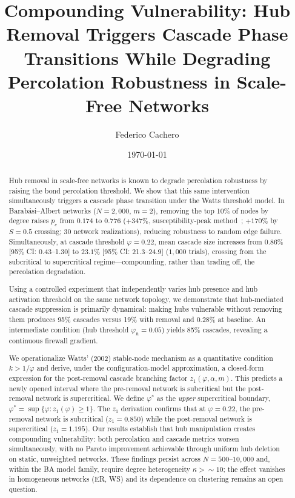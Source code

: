 \documentclass[aps,pre,twocolumn,superscriptaddress,showpacs]{revtex4-2}
\newcommand{\pc}{p_c}
\begin{document}
\title{Compounding Vulnerability: Hub Removal Triggers Cascade Phase Transitions While Degrading Percolation Robustness in Scale-Free Networks}

\author{Federico Cachero}

\date{\today}

\begin{abstract}
Hub removal in scale-free networks is known to degrade percolation robustness by raising the bond percolation threshold. We show that this same intervention simultaneously triggers a cascade phase transition under the Watts threshold model. In Barab\'asi--Albert networks ($N=2{,}000$, $m=2$), removing the top 10\% of nodes by degree raises $\pc$ from $0.174$ to $0.776$ ($+347\%$, susceptibility-peak method~\cite{Newman2001}; $+170\%$ by $S=0.5$ crossing; 30 network realizations), reducing robustness to random edge failure. Simultaneously, at cascade threshold $\varphi=0.22$, mean cascade size increases from $0.86\%$ [95\% CI: 0.43--1.30] to $23.1\%$ [95\% CI: 21.3--24.9] ($1{,}000$ trials), crossing from the subcritical to supercritical regime---compounding, rather than trading off, the percolation degradation.

Using a controlled experiment that independently varies hub presence and hub activation threshold on the same network topology, we demonstrate that hub-mediated cascade suppression is primarily dynamical: making hubs vulnerable without removing them produces 95\% cascades versus 19\% with removal and 0.28\% at baseline. An intermediate condition (hub threshold $\varphi_h=0.05$) yields 85\% cascades, revealing a continuous firewall gradient.

We operationalize Watts' (2002) stable-node mechanism as a quantitative condition $k > 1/\varphi$ and derive, under the configuration-model approximation, a closed-form expression for the post-removal cascade branching factor $z_1(\varphi, \alpha, m)$. This predicts a newly opened interval where the pre-removal network is subcritical but the post-removal network is supercritical. We define $\varphi^*$ as the \emph{upper} supercritical boundary, $\varphi^* = \sup\{\varphi : z_1(\varphi) \geq 1\}$. The $z_1$ derivation confirms that at $\varphi=0.22$, the pre-removal network is subcritical ($z_1=0.850$) while the post-removal network is supercritical ($z_1=1.195$). Our results establish that hub manipulation creates compounding vulnerability: both percolation and cascade metrics worsen simultaneously, with no Pareto improvement achievable through uniform hub deletion on static, unweighted networks. These findings persist across $N=500$--$10{,}000$ and, within the BA model family, require degree heterogeneity $\kappa > {\sim}10$; the effect vanishes in homogeneous networks (ER, WS) and its dependence on clustering remains an open question.
\end{abstract}
\end{document}
